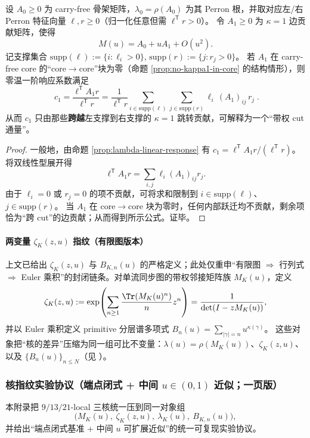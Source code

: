 \begin{proposition}[支撑剪切（cut-flux）公式：\texorpdfstring{$\kappa=1$}{kappa=1} 不在 core 内部时的一阶通量]\label{prop:c1-cut-flux}
设 \(A_0\ge 0\) 为 carry-free 骨架矩阵，\(\lambda_0=\rho(A_0)\) 为其 Perron 根，并取对应左/右 Perron 特征向量 \(\ell,r\ge 0\)（归一化任意但需 \(\ell^{\mathsf T}r>0\)）。
令 \(A_1\ge 0\) 为 \(\kappa=1\) 边贡献矩阵，使得
\[
M(u)=A_0+uA_1+O(u^2).
\]
记支撑集合
\(
\mathrm{supp}(\ell):=\{i:\ell_i>0\}
\),
\(
\mathrm{supp}(r):=\{j:r_j>0\}
\)。
若 \(A_1\) 在 carry-free core 的“core\(\to\)core”块为零（命题 \ref{prop:no-kappa1-in-core} 的结构情形），则零温一阶响应系数满足
\[
\boxed{\;
c_1=\frac{\ell^{\mathsf T}A_1r}{\ell^{\mathsf T}r}
=\frac{1}{\ell^{\mathsf T}r}\sum_{i\in\mathrm{supp}(\ell)}\sum_{j\in\mathrm{supp}(r)}\ell_i\,(A_1)_{ij}\,r_j\; }.
\]
从而 \(c_1\) 只由那些\textbf{跨越}左支撑到右支撑的 \(\kappa=1\) 跳转贡献，可解释为一个“带权 cut 通量”。
\end{proposition}
\begin{proof}
一般地，由命题 \ref{prop:lambda-linear-response} 有
\(
c_1=\ell^{\mathsf T}A_1r/(\ell^{\mathsf T}r)
\)。
将双线性型展开得
\[
\ell^{\mathsf T}A_1r=\sum_{i,j}\ell_i(A_1)_{ij}r_j.
\]
由于 \(\ell_i=0\) 或 \(r_j=0\) 的项不贡献，可将求和限制到 \(i\in\mathrm{supp}(\ell)\)、\(j\in\mathrm{supp}(r)\)。
当 \(A_1\) 在 core\(\to\)core 块为零时，任何内部跃迁均不贡献，剩余项恰为“跨 cut”的边贡献；从而得到所示公式。证毕。
\end{proof}

\paragraph{两变量 \texorpdfstring{$\zeta_K(z,u)$}{zeta(z,u)} 指纹（有限图版本）}
上文已给出 $\zeta_K(z,u)$ 与 $B_{K,n}(u)$ 的严格定义；此处仅重申“有限图 $\Rightarrow$ 行列式 $\Rightarrow$ Euler 乘积”的封闭链条。对单流同步图的带权邻接矩阵族 $M_K(u)$，定义
\[
\zeta_K(z,u)
:=\exp\!\left(\sum_{n\ge 1}\frac{\Tr(M_K(u)^n)}{n}z^n\right)
=\frac{1}{\det(I-zM_K(u))},
\]
并以 Euler 乘积定义 primitive 分层谱多项式
\(
B_n(u)=\sum_{|\gamma|=n}u^{\kappa(\gamma)}
\)。
这些对象把“核的差异”压缩为同一组可比不变量：$\lambda(u)=\rho(M_K(u))$、$\zeta_K(z,u)$、以及 $\{B_n(u)\}_{n\le N}$（见 \cite{Ruelle1976ZetaExpanding,ParryPollicott1990Zeta,BrinStuck2002}）。

\subsubsection{核指纹实验协议（端点闭式 + 中间 \texorpdfstring{$u\in(0,1)$}{u in (0,1)} 近似；一页版）}\label{app:kernel-fingerprint-protocol}
本附录把 $9/13/21$-local 三核统一压到同一对象组
\[
\bigl(M_K(u),\ \zeta_K(z,u),\ \lambda_K(u),\ B_{K,n}(u)\bigr),
\]
并给出“端点闭式基准 + 中间 $u$ 可扩展近似”的统一可复现实验协议。

